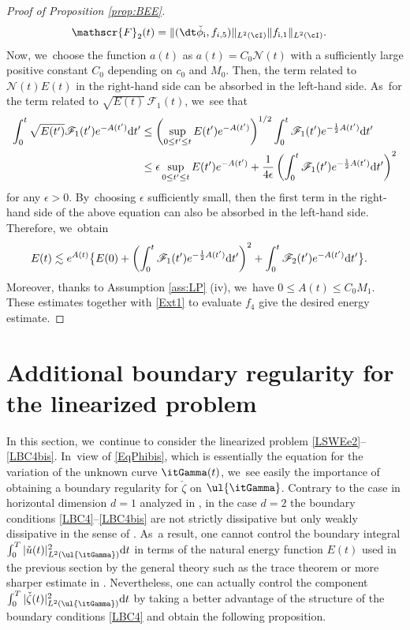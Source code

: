 \begin{proof}[Proof of Proposition \ref{prop:BEE}]
\begin{align*}
\mathscr{F}_2(t)
&= \|(\dt\check{\phi}_\mathrm{i},f_{i,5})\|_{L^2(\cI)}\|f_{{\rm i},1}\|_{L^2(\cI)}.
\end{align*}
Now, we~choose the function $a(t)$ as $a(t)=C_0\mathscr{N}(t)$ with a sufficiently large positive constant $C_0$ depending on $c_0$ and $M_0$.
Then, the term related to $\mathscr{N}(t)E(t)$ in the right-hand side can be absorbed in the left-hand side. As~for the term related to $\sqrt{E(t)}\,\mathscr{F}_1(t)$, we~see that
\begin{align*}
\int_0^t \sqrt{E(t')}\mathscr{F}_1(t')e^{-A(t')} {\rm d}t'
&\leq \left(\sup_{0\leq t'\leq t} E(t')e^{-A(t')} \right)^{1/2}\int_0^t \mathscr{F}_1(t')e^{-\frac12A(t')}{\rm d}t' \\
&\leq \epsilon \sup_{0\leq t'\leq t} E(t')e^{-A(t')} + \frac{1}{4\epsilon}\left(\int_0^t \mathscr{F}_1(t')e^{-\frac12A(t')}{\rm d}t' \right)^2
\end{align*}
for any $\epsilon>0$. By~choosing $\epsilon$ sufficiently small, then the first term in the right-hand side of the above equation can also be absorbed in the left-hand side.
Therefore, we~obtain
\begin{align*}
E(t) &\lesssim e^{A(t)} \bigl\{ E(0) + \left(\int_0^t \mathscr{F}_1(t')e^{-\frac12A(t')}{\rm d}t' \right)^2
+ \int_0^t \mathscr{F}_2(t')e^{-A(t')} {\rm d}t' \bigr\}.
\end{align*}
Moreover, thanks to Assumption \ref{ass:LP} (iv), we~have $0\leq A(t)\leq C_0M_1$.
These estimates together with \eqref{Ext1} to evaluate $f_4$ give the desired energy estimate.
\end{proof}

\section{Additional boundary regularity for the linearized problem}\label{sect:AddBR}
In this section, we~continue to consider the linearized problem \eqref{LSWEe2}--\eqref{LBC4bis}. In~view of \eqref{EqPhibis}, which is essentially the equation for the variation of the unknown curve $\itGamma(t)$, we~see easily the importance of obtaining a boundary regularity for $\check{\zeta}$ on $\ul{\itGamma}$.
Contrary to the case in horizontal dimension $d=1$ analyzed in \cite{IguchiLannes2021},
in the case $d=2$ the boundary conditions \eqref{LBC4}--\eqref{LBC4bis} are not strictly dissipative but only weakly dissipative
in the sense of \cite{IguchiLannes2023}. As~a result, one cannot control the boundary integral $\int_0^T|\check{u}(t)|_{L^2(\ul{\itGamma})}^2 {\rm d}t$ in terms of the natural energy function $E(t)$
used in the previous section by the general theory such as the trace theorem or more sharper estimate in \cite{Tataru1998}.
Nevertheless, one can actually control the component $\int_0^T|\check{\zeta}(t)|_{L^2(\ul{\itGamma})}^2 {\rm d}t$ by taking a better advantage of the structure
of the boundary conditions \eqref{LBC4} and obtain the following proposition.

